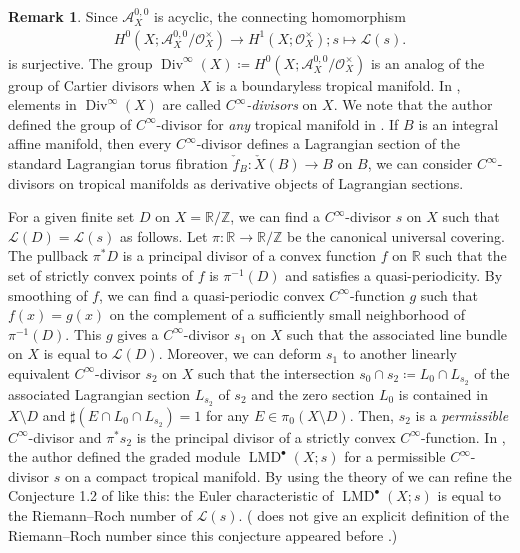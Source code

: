 \documentclass[a4paper,dvipdfmx,reqno,12pt]{amsart}
\theoremstyle{definition}
\newtheorem{remark}[theorem]{Remark}
\newcommand{\deq}{\coloneqq}
\newcommand{\opn}[1]{\operatorname{#1}}
\numberwithin{equation}{section}
\begin{document}
\begin{remark}
Since $\mathcal{A}^{0,0}_X$ is acyclic,
the connecting homomorphism
\begin{align}
H^{0}(X;\mathcal{A}^{0,0}_X/\mathcal{O}_X^{\times})
\to H^{1}(X;\mathcal{O}_X^{\times}); s\mapsto \mathcal{L}(s).
\end{align}
is surjective. The group 
$\opn{Div}^{\infty}(X)\deq 
H^{0}(X;\mathcal{A}^{0,0}_X/\mathcal{O}_X^{\times})$
is an analog of the group of Cartier divisors
when $X$ is a boundaryless tropical manifold.
In \cite{tsutsui2023graded}, elements 
in $\opn{Div}^{\infty}(X)$ are called 
\emph{$C^{\infty}$-divisors} on $X$.
We note that the author 
defined the group of $C^{\infty}$-divisor for \emph{any}
tropical manifold in \cite{tsutsui2023graded}.
If $B$ is an integral affine manifold,
then every $C^{\infty}$-divisor defines
a Lagrangian section of the standard Lagrangian
torus fibration $\check{f}_B\colon \check{X}(B)\to B$
on $B$, we can consider $C^{\infty}$-divisors on
tropical manifolds as derivative objects
of Lagrangian sections.

For a given finite set $D$ on
$X=\mathbb{R}/\mathbb{Z}$,
we can find a $C^{\infty}$-divisor $s$ on $X$
such that $\mathcal{L}(D)=\mathcal{L}(s)$ as follows.
Let $\pi\colon \mathbb{R}\to \mathbb{R}/\mathbb{Z}$
be the canonical universal covering.
The pullback $\pi^* D$ is a principal divisor 
of a convex function $f$ on $\mathbb{R}$ such that 
the set of strictly convex points of $f$ is $\pi^{-1}(D)$
and satisfies a quasi-periodicity.
By smoothing of $f$, we can find a quasi-periodic
convex $C^{\infty}$-function $g$ such that $f(x)=g(x)$ on 
the complement of a sufficiently 
small neighborhood of $\pi^{-1}(D)$. 
This $g$ gives a $C^{\infty}$-divisor $s_1$ on
$X$ such that the associated line bundle on $X$ is equal
to $\mathcal{L}(D)$.
Moreover, we can deform $s_1$ to another 
linearly equivalent 
$C^{\infty}$-divisor $s_2$ on $X$ such that 
the intersection $s_0\cap s_2\deq 
L_{0}\cap L_{s_2}$ of the associated 
Lagrangian section $L_{s_2}$
of $s_2$ and the zero section $L_0$ is contained in 
$X\setminus D$ and $\sharp (E\cap L_{0}\cap L_{s_2})=1$
for any $E\in \pi_0(X\setminus D)$.
Then, $s_2$ is a \emph{permissible} 
$C^{\infty}$-divisor and $\pi^{*}s_2$ is the 
principal divisor of a strictly convex
$C^{\infty}$-function. 
In \cite{tsutsui2023graded}, the author
defined the graded module $\opn{LMD}^{\bullet}(X;s)$
for a permissible $C^{\infty}$-divisor $s$ on
a compact tropical manifold.
By using the theory of \cite{demedrano2023chern}
we can refine the Conjecture 1.2 of 
\cite{tsutsui2023graded}
like this: the Euler characteristic of
$\opn{LMD}^{\bullet}(X;s)$ 
is equal to the Riemann--Roch number of 
$\mathcal{L}(s)$.
(\cite[Conjecture 1.2]{tsutsui2023graded} does not
give an explicit definition of the Riemann--Roch number
since this conjecture appeared before
\cite{demedrano2023chern}.)



\end{remark}
\end{document}
